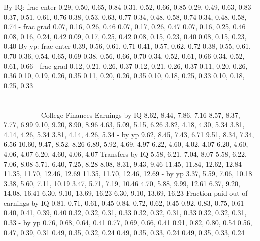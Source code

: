                      By IQ: frac enter       0.29, 0.50, 0.65, 0.84       0.31, 0.52, 0.66, 0.85   0.29, 0.49, 0.63, 0.83    0.37, 0.51, 0.61, 0.76      0.38, 0.53, 0.63, 0.77      0.34, 0.48, 0.58, 0.74      0.34, 0.48, 0.58, 0.74
                           - frac grad       0.07, 0.16, 0.26, 0.46       0.07, 0.17, 0.26, 0.47   0.07, 0.16, 0.25, 0.46    0.08, 0.16, 0.24, 0.42      0.09, 0.17, 0.25, 0.42      0.08, 0.15, 0.23, 0.40      0.08, 0.15, 0.23, 0.40
                     By yp: frac enter       0.39, 0.56, 0.61, 0.71       0.41, 0.57, 0.62, 0.72   0.38, 0.55, 0.61, 0.70    0.36, 0.54, 0.65, 0.69      0.38, 0.56, 0.66, 0.70      0.34, 0.52, 0.61, 0.66      0.34, 0.52, 0.61, 0.66
                           - frac grad       0.12, 0.21, 0.26, 0.37       0.12, 0.21, 0.26, 0.37   0.11, 0.20, 0.26, 0.36    0.10, 0.19, 0.26, 0.35      0.11, 0.20, 0.26, 0.35      0.10, 0.18, 0.25, 0.33      0.10, 0.18, 0.25, 0.33
---------------------------------------------------------------------------------------------------------------------------------------------------------------------------------------------------------------------------------------
                      College Finances                                                                                                                                                                                                 
                        Earnings by IQ       8.62, 8.44, 7.86, 7.16       8.57, 8.37, 7.77, 6.99   9.10, 9.20, 8.90, 8.96    4.63, 5.09, 5.15, 6.26      3.82, 4.18, 4.30, 5.34      3.81, 4.14, 4.26, 5.34      3.81, 4.14, 4.26, 5.34
                               - by yp       9.62, 8.45, 7.43, 6.71       9.51, 8.34, 7.34, 6.56  10.60, 9.47, 8.52, 8.26    6.89, 5.92, 4.69, 4.97      6.22, 4.60, 4.02, 4.07      6.20, 4.60, 4.06, 4.07      6.20, 4.60, 4.06, 4.07
                       Transfers by IQ       5.58, 6.21, 7.04, 8.07       5.58, 6.22, 7.06, 8.08   5.71, 6.40, 7.25, 8.28    8.08, 8.31, 9.43, 9.46  11.45, 11.84, 12.62, 12.84  11.35, 11.70, 12.46, 12.69  11.35, 11.70, 12.46, 12.69
                               - by yp      3.37, 5.59, 7.06, 10.18      3.38, 5.60, 7.11, 10.19  3.47, 5.71, 7.19, 10.46   4.70, 5.88, 9.99, 12.61    6.37, 9.20, 14.08, 16.41    6.30, 9.10, 13.69, 16.23    6.30, 9.10, 13.69, 16.23
   Fraction paid out of earnings by IQ       0.81, 0.71, 0.61, 0.45       0.84, 0.72, 0.62, 0.45   0.92, 0.83, 0.75, 0.61    0.40, 0.41, 0.39, 0.40      0.32, 0.32, 0.31, 0.33      0.32, 0.32, 0.31, 0.33      0.32, 0.32, 0.31, 0.33
                               - by yp       0.76, 0.68, 0.64, 0.41       0.77, 0.69, 0.66, 0.41   0.91, 0.82, 0.80, 0.54    0.56, 0.47, 0.39, 0.31      0.49, 0.35, 0.32, 0.24      0.49, 0.35, 0.33, 0.24      0.49, 0.35, 0.33, 0.24
